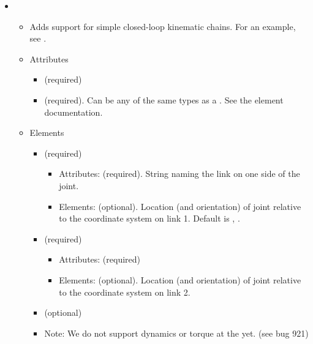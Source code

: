 \begin{itemize}
\item {}
\begin{itemize}
\item Adds support for simple closed-loop kinematic chains.  For an example, see .  
\item Attributes
\begin{itemize}
\item {} (required)
\item {} (required). Can be any of the same types as a . See the  element documentation. 
\end{itemize}
\item Elements
\begin{itemize}
\item {} (required)
\begin{itemize}
\item Attributes:  (required). String naming the link on one side of the joint.
\item Elements:  (optional). Location (and orientation) of joint relative to the coordinate system on link 1. Default is , . 
\end{itemize}
\item {} (required)
\begin{itemize}
\item Attributes:  (required)
\item Elements:  (optional). Location (and orientation) of joint relative to the coordinate system on link 2. 
\end{itemize}
\item {} (optional) 
\item Note: We do not support dynamics or torque at the  yet. (see bug 921) 
\end{itemize}
\end{itemize}


\end{itemize}
